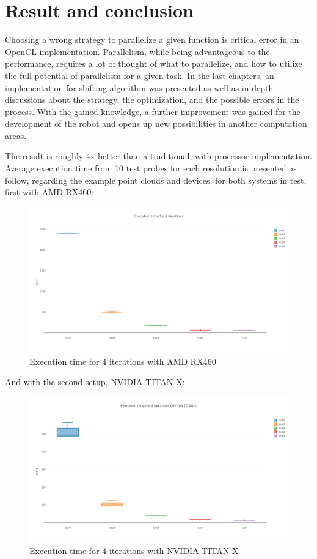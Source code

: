 \chapter{Result and conclusion}
Choosing a wrong strategy to parallelize a given function is critical error in an OpenCL implementation. Parallelism, while being advantageous to the performance, requires a lot of thought of what to parallelize, and how to utilize the full potential of parallelism for a given task. In the last chapters, an implementation for shifting algorithm was presented as well as in-depth discussions about the strategy, the optimization, and the possible errors in the process. With the gained knowledge, a further improvement was gained for the development of the robot and opens up new possibilities in another computation areas.

The result is roughly 4x better than a traditional, with processor implementation. Average execution time from 10 test probes for each resolution is presented as follow, regarding the example point clouds and devices, for both systems in test, first with AMD RX460:

\begin{figure}[H]
	\centering
	\includegraphics[width=14cm]{images/AllfouriterationRX460.png}
	\caption{Execution time for 4 iterations with AMD RX460}
	\label{ExampleOCTImage}
\end{figure}
\pagebreak
And with the second setup, NVIDIA TITAN X:

\begin{figure}[H]
	\centering
	\includegraphics[width=14cm]{images/AllfourIterationTITANX.png}
	\caption{Execution time for 4 iterations with NVIDIA TITAN X}
	\label{ExampleOCTImage}
\end{figure}

